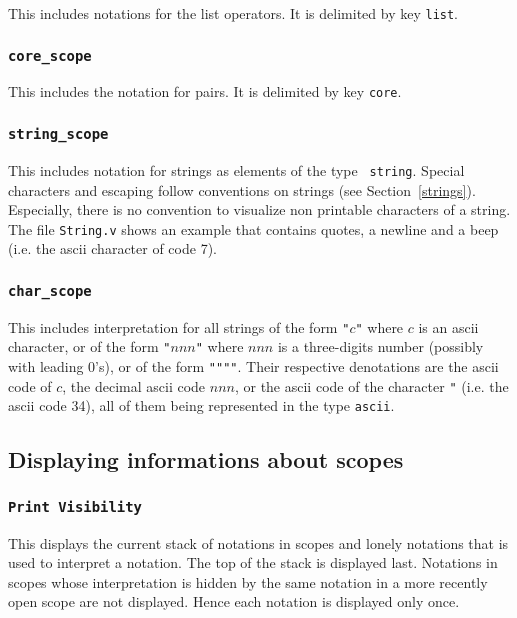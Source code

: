 This includes notations for the list operators. It is
delimited by key {\tt list}.

\subsubsection{\tt core\_scope}

This includes the notation for pairs. It is delimited by key {\tt core}.

\subsubsection{\tt string\_scope}

This includes notation for strings as elements of the type {\tt
string}.  Special characters and escaping follow {\Coq} conventions
on strings (see Section~\ref{strings}). Especially, there is no
convention to visualize non printable characters of a string.  The
file {\tt String.v} shows an example that contains quotes, a newline
and a beep (i.e. the ascii character of code 7).

\subsubsection{\tt char\_scope}

This includes interpretation for all strings of the form
\verb!"!$c$\verb!"! where $c$ is an ascii character, or of the form
\verb!"!$nnn$\verb!"! where $nnn$ is a three-digits number (possibly
with leading 0's), or of the form \verb!""""!. Their respective
denotations are the ascii code of $c$, the decimal ascii code $nnn$,
or the ascii code of the character \verb!"! (i.e. the ascii code
34), all of them being represented in the type {\tt ascii}.

\subsection{Displaying informations about scopes}

\subsubsection{\tt Print Visibility}

This displays the current stack of notations in scopes and lonely
notations that is used to interpret a notation. The top of the stack
is displayed last. Notations in scopes whose interpretation is hidden
by the same notation in a more recently open scope are not
displayed. Hence each notation is displayed only once.

